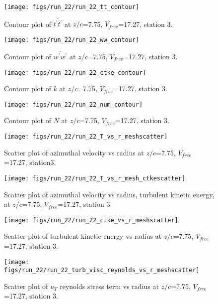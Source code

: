 \begin{figure}[H]
\centering
\texttt{[image: figs/run\_22/run\_22\_tt\_contour]}
\caption{Contour plot of $\overline{t^\prime t^\prime}$ at $z/c$=7.75, $V_{free}$=17.27, station 3.}
\end{figure}


\begin{figure}[H]
\centering
\texttt{[image: figs/run\_22/run\_22\_ww\_contour]}
\caption{Contour plot of $\overline{w^\prime w^\prime}$ at $z/c$=7.75, $V_{free}$=17.27, station 3.}
\end{figure}


\begin{figure}[H]
\centering
\texttt{[image: figs/run\_22/run\_22\_ctke\_contour]}
\caption{Contour plot of $k$ at $z/c$=7.75, $V_{free}$=17.27, station 3.}
\end{figure}


\begin{figure}[H]
\centering
\texttt{[image: figs/run\_22/run\_22\_num\_contour]}
\caption{Contour plot of $N$ at $z/c$=7.75, $V_{free}$=17.27, station 3.}
\end{figure}


\begin{figure}[H]
\centering
\texttt{[image: figs/run\_22/run\_22\_T\_vs\_r\_meshscatter]}
\caption{Scatter plot of azimuthal velocity vs radius at $z/c$=7.75, $V_{free}$=17.27, station3.}
\end{figure}


\begin{figure}[H]
\centering
\texttt{[image: figs/run\_22/run\_22\_T\_vs\_r\_mesh\_ctkescatter]}
\caption{Scatter plot of azimuthal velocity vs radius, turbulent kinetic energy, at $z/c$=7.75, $V_{free}$=17.27, station 3.}
\end{figure}


\begin{figure}[H]
\centering
\texttt{[image: figs/run\_22/run\_22\_ctke\_vs\_r\_meshscatter]}
\caption{Scatter plot of turbulent kinetic energy vs radius at $z/c$=7.75, $V_{free}$=17.27, station 3.}
\end{figure}


\begin{figure}[H]
\centering
\texttt{[image: figs/run\_22/run\_22\_turb\_visc\_reynolds\_vs\_r\_meshscatter]}
\caption{Scatter plot of $
u_T$ reynolds stress term vs radius at $z/c$=7.75, $V_{free}$=17.27, station 3.}
\end{figure}


